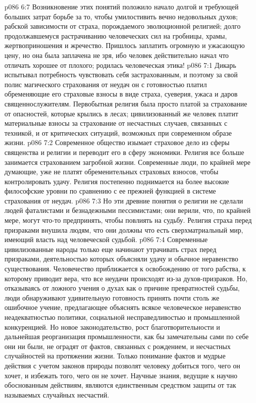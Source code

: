 \vs p086 6:7 Возникновение этих понятий положило начало долгой и требующей больших затрат борьбе за то, чтобы умилостивить вечно недовольных духов; рабской зависимости от страха, порождаемого эволюционной религией; долго продолжавшемуся растрачиванию человеческих сил на гробницы, храмы, жертвоприношения и жречество. Пришлось заплатить огромную и ужасающую цену, но она была заплачена не зря, ибо человек действительно начал что отличать хорошее от плохого; родилась человеческая этика!
\vs p086 7:1 Дикарь испытывал потребность чувствовать себя застрахованным, и поэтому за свой полис магического страхования от неудач он с готовностью платил обременяющие его страховые взносы в виде страха, суеверия, ужаса и даров священнослужителям. Первобытная религия была просто платой за страхование от опасностей, которые крылись в лесах; цивилизованный же человек платит материальные взносы за страхование от несчастных случаев, связанных с техникой, и от критических ситуаций, возможных при современном образе жизни.
\vs p086 7:2 Современное общество изымает страховое дело из сферы священства и религии и переводит его в сферу экономики. Религия все больше занимается страхованием загробной жизни. Современные люди, по крайней мере думающие, уже не платят обременительных страховых взносов, чтобы контролировать удачу. Религия постепенно поднимается на более высокие философские уровни по сравнению с ее прежней функцией в системе страхования от неудач.
\vs p086 7:3 Но эти древние понятия о религии не сделали людей фаталистами и безнадежными пессимистами; они верили, что, по крайней мере, могут что\hyp{}то предпринять, чтобы повлиять на судьбу. Религия страха перед призраками внушила людям, что они должны  что есть сверхматриальный мир, имеющий власть над человеческой судьбой.
\vs p086 7:4 Современные цивилизованные народы только еще начинают утрачивать страх перед призраками, деятельностью которых объясняли удачу и обычное неравенство существования. Человечество приближается к освобождению от того рабства, к которому приводит вера, что все неудачи происходят из\hyp{}за духов\hyp{}призраков. Но, отказываясь от ложного учения о духах как о причине превратностей судьбы, люди обнаруживают удивительную готовность принять почти столь же ошибочное учение, предлагающее объяснять всякое человеческое неравенство неадекватностью политики, социальной несправедливостью и промышленной конкуренцией. Но новое законодательство, рост благотворительности и дальнейшая реорганизация промышленности, как бы замечательны сами по себе они ни были, не оградят от фактов, связанных с рождением, и несчастных случайностей на протяжении жизни. Только понимание фактов и мудрые действия с учетом законов природы позволят человеку добиться того, чего он хочет, и избежать того, чего он не хочет. Научные знания, ведущие к научно обоснованным действиям, являются единственным средством защиты от так называемых случайных несчастий.
